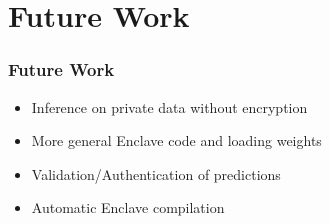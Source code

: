 \documentclass[aspectratio=169,nototalframenumber]{beamer}
\begin{document}

\section{Future Work}
\begin{frame}
  \frametitle{Future Work}
  \begin{itemize}
  \item Inference on private data without encryption
  \item More general Enclave code and loading weights
  \item Validation/Authentication of predictions
  \item Automatic Enclave compilation
  \end{itemize}
\end{frame}
\end{document}
